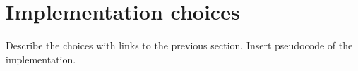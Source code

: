 \section{Implementation choices}
Describe the choices with links to the previous section.
Insert pseudocode of the implementation.